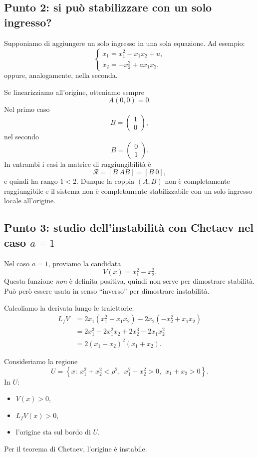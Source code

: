 \subsection{Punto 2: si pu\`o stabilizzare con un solo ingresso?}

Supponiamo di aggiungere un solo ingresso in una sola equazione. Ad esempio:
\[
\begin{cases}
\dot x_1 = x_1^2 - x_1x_2 + u,\\[4pt]
\dot x_2 = -x_2^2 + a x_1x_2,
\end{cases}
\]
oppure, analogamente, nella seconda.

Se linearizziamo all'origine, otteniamo sempre
\[
A(0,0)=0.
\]
Nel primo caso
\[
B=
\begin{pmatrix}
1\\
0
\end{pmatrix},
\]
nel secondo
\[
B=
\begin{pmatrix}
0\\
1
\end{pmatrix}.
\]
In entrambi i casi la matrice di raggiungibilit\`a \`e
\[
\mathcal R=[B\ AB]=[B\ 0],
\]
e quindi ha rango \(1<2\).  
Dunque la coppia \((A,B)\) non \`e completamente raggiungibile e il sistema non \`e completamente stabilizzabile con un solo ingresso locale all'origine.

\subsection{Punto 3: studio dell'instabilit\`a con Chetaev nel caso \(a=1\)}

Nel caso \(a=1\), proviamo la candidata
\[
V(x)=x_1^2-x_2^2.
\]
Questa funzione \emph{non} \`e definita positiva, quindi non serve per dimostrare stabilit\`a.  
Pu\`o per\`o essere usata in senso ``inverso'' per dimostrare instabilit\`a.

Calcoliamo la derivata lungo le traiettorie:
\begin{align*}
L_fV
&= 2x_1(x_1^2-x_1x_2) -2x_2(-x_2^2+x_1x_2)\\
&=2x_1^3-2x_1^2x_2+2x_2^3-2x_1x_2^2\\
&=2(x_1-x_2)^2(x_1+x_2).
\end{align*}

Consideriamo la regione
\[
U=\left\{x:\ x_1^2+x_2^2<\rho^2,\ \ x_1^2-x_2^2>0,\ \ x_1+x_2>0\right\}.
\]
In \(U\):
\begin{itemize}
    \item \(V(x)>0\),
    \item \(L_fV(x)>0\),
    \item l'origine sta sul bordo di \(U\).
\end{itemize}
Per il teorema di Chetaev, l'origine \`e instabile.


